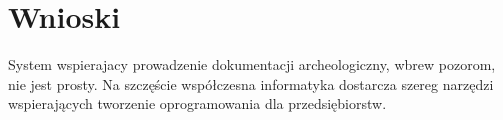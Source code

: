 \chapter{Wnioski}
System wspierajacy prowadzenie dokumentacji archeologiczny, wbrew pozorom, nie jest prosty. Na szczęście współczesna informatyka dostarcza szereg narzędzi wspierających tworzenie oprogramowania dla przedsiębiorstw. 

